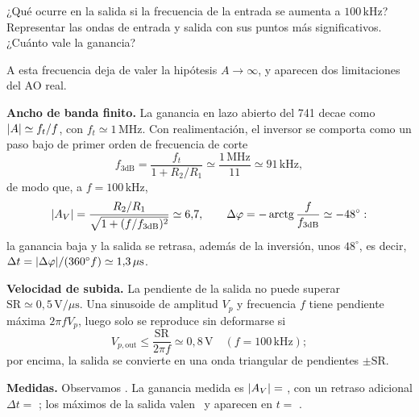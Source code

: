 \begin{pregunta}
¿Qué ocurre en la salida si la frecuencia de la entrada se aumenta a $100\,\mathrm{kHz}$? Representar las ondas de
entrada y salida con sus puntos más significativos. ¿Cuánto vale la ganancia?
\end{pregunta}

\begin{respuesta}
A esta frecuencia deja de valer la hipótesis $A\to\infty$, y aparecen dos limitaciones del AO real.

\textbf{Ancho de banda finito.} La ganancia en lazo abierto del 741 decae como $\lvert A\rvert\simeq f_t/f$, con
$f_t\simeq1\,\mathrm{MHz}$. Con realimentación, el inversor se comporta como un paso bajo de primer orden de frecuencia
de corte
\begin{equation}\label{eq:i-f3dB}
  f_{3\mathrm{dB}}=\frac{f_t}{1+R_2/R_1}\simeq\frac{1\,\mathrm{MHz}}{11}\simeq91\,\mathrm{kHz},
\end{equation}
de modo que, a $f=100\,\mathrm{kHz}$,
\begin{equation}\label{eq:i-100k}
  \lvert A_V\rvert=\frac{R_2/R_1}{\sqrt{1+(f/f_{3\mathrm{dB}})^{2}}}\simeq6{,}7,\qquad
  \Delta\varphi=-\operatorname{arctg}\frac{f}{f_{3\mathrm{dB}}}\simeq-48^{\circ} :
\end{equation}
la ganancia baja y la salida se retrasa, además de la inversión, unos $48^{\circ}$, es decir,
$\Delta t=\lvert \Delta\varphi\rvert/(360^{\circ}f)\simeq1{,}3\,\mu\mathrm{s}$.

\textbf{Velocidad de subida.} La pendiente de la salida no puede superar $\mathrm{SR}\simeq0{,}5\,\mathrm{V}/\mu\mathrm{s}$. Una
sinusoide de amplitud $V_p$ y frecuencia $f$ tiene pendiente máxima $2\pi fV_p$, luego solo se reproduce sin
deformarse si
\begin{equation}\label{eq:i-slew}
  V_{p,\mathrm{out}}\le\frac{\mathrm{SR}}{2\pi f}\simeq0{,}8\,\mathrm{V}\quad(f=100\,\mathrm{kHz});
\end{equation}
por encima, la salida se convierte en una onda triangular de pendientes $\pm\mathrm{SR}$.

\textbf{Medidas.} Observamos \dato. La ganancia medida es $\lvert A_V\rvert=$ \dato, con un retraso adicional
$\Delta t=$ \dato; los máximos de la salida valen \dato\ y aparecen en $t=$ \dato.
\begin{center}
\end{center}
\end{respuesta}

